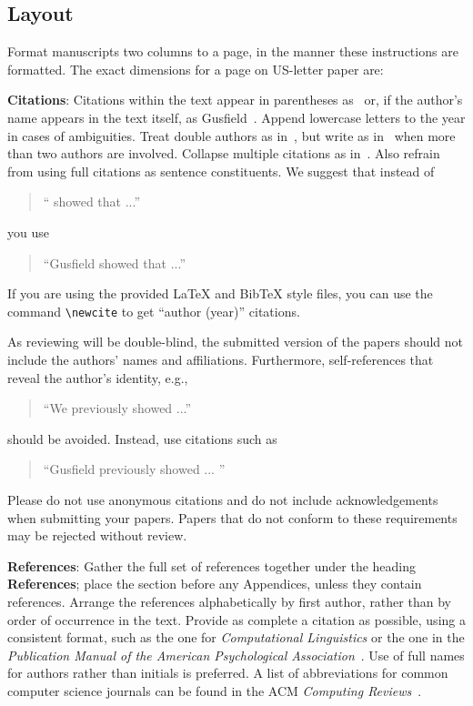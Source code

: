 \documentclass[11pt]{article}
\begin{document}
\subsection{Layout}
\label{ssec:layout}

Format manuscripts two columns to a page, in the manner these
instructions are formatted. The exact dimensions for a page on US-letter
paper are:


{\bf Citations}: Citations within the text appear
in parentheses as~\cite{Gusfield:97} or, if the author's name appears in
the text itself, as Gusfield~. Append lowercase letters to the year in cases of ambiguities. Treat double authors as in~\cite{Aho:72}, but write as in~\cite{Chandra:81} when more than two authors are involved. Collapse multiple citations as in~\cite{Gusfield:97,Aho:72}. Also refrain from using full citations as sentence constituents. We suggest that instead of
\begin{quote}
  ``\cite{Gusfield:97} showed that ...''
\end{quote}
you use
\begin{quote}
``Gusfield    showed that ...''
\end{quote}

If you are using the provided \LaTeX{} and Bib\TeX{} style files, you
can use the command \verb|\newcite| to get ``author (year)'' citations.

As reviewing will be double-blind, the submitted version of the papers should not include the
authors' names and affiliations. Furthermore, self-references that
reveal the author's identity, e.g.,
\begin{quote}
``We previously showed \cite{Gusfield:97} ...''
\end{quote}
should be avoided. Instead, use citations such as
\begin{quote}
``Gusfield 
previously showed ... ''
\end{quote}

Please do not  use anonymous
citations and  do not include acknowledgements when submitting your papers. Papers that do not conform
to these requirements may be rejected without review.

\textbf{References}: Gather the full set of references together under
the heading {\bf References}; place the section before any Appendices,
unless they contain references. Arrange the references alphabetically
by first author, rather than by order of occurrence in the text.
Provide as complete a citation as possible, using a consistent format,
such as the one for {\em Computational Linguistics\/} or the one in the
{\em Publication Manual of the American
Psychological Association\/}~\cite{APA:83}.  Use of full names for
authors rather than initials is preferred.  A list of abbreviations
for common computer science journals can be found in the ACM
{\em Computing Reviews\/}~\cite{ACM:83}.
\end{document}
